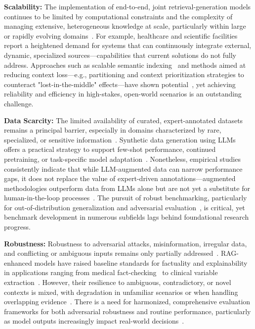 \documentclass[sigconf]{acmart}
\begin{document}
\textbf{Scalability:} The implementation of end-to-end, joint retrieval-generation models continues to be limited by computational constraints and the complexity of managing extensive, heterogeneous knowledge at scale, particularly within large or rapidly evolving domains~\cite{ref1,ref4,ref7,ref10,ref21,ref29,ref38,ref46,ref49,ref51,ref52,ref54,ref61,ref62}. For example, healthcare and scientific facilities~\cite{ref1,ref30} report a heightened demand for systems that can continuously integrate external, dynamic, specialized sources—capabilities that current solutions do not fully address. Approaches such as scalable semantic indexing~\cite{ref45} and methods aimed at reducing context loss—e.g., partitioning and context prioritization strategies to counteract "lost-in-the-middle" effects—have shown potential~\cite{ref10,ref49}, yet achieving reliability and efficiency in high-stakes, open-world scenarios is an outstanding challenge.

\textbf{Data Scarcity:} The limited availability of curated, expert-annotated datasets remains a principal barrier, especially in domains characterized by rare, specialized, or sensitive information~\cite{ref8,ref16,ref19,ref22,ref26,ref28,ref31,ref34,ref36}. Synthetic data generation using LLMs offers a practical strategy to support few-shot performance, continued pretraining, or task-specific model adaptation~\cite{ref16,ref22,ref34,ref61}. Nonetheless, empirical studies consistently indicate that while LLM-augmented data can narrow performance gaps, it does not replace the value of expert-driven annotations—augmented methodologies outperform data from LLMs alone but are not yet a substitute for human-in-the-loop processes~\cite{ref51,ref52}. The pursuit of robust benchmarking, particularly for out-of-distribution generalization and adversarial evaluation~\cite{ref26}, is critical, yet benchmark development in numerous subfields lags behind foundational research progress.

\textbf{Robustness:} Robustness to adversarial attacks, misinformation, irregular data, and conflicting or ambiguous inputs remains only partially addressed~\cite{ref2,ref3,ref7,ref37,ref39,ref49,ref51,ref54}. RAG-enhanced models have raised baseline standards for factuality and explainability in applications ranging from medical fact-checking~\cite{ref54} to clinical variable extraction~\cite{ref3}. However, their resilience to ambiguous, contradictory, or novel contexts is mixed, with degradation in unfamiliar scenarios or when handling overlapping evidence~\cite{ref49,ref26}. There is a need for harmonized, comprehensive evaluation frameworks for both adversarial robustness and routine performance, particularly as model outputs increasingly impact real-world decisions~\cite{ref26,ref49}.
\end{document}
